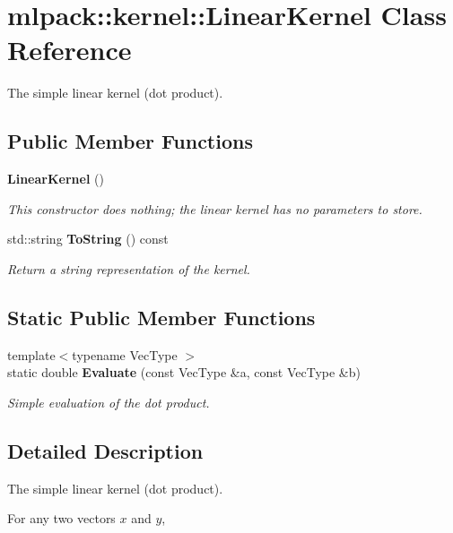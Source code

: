 \section{mlpack\-:\-:kernel\-:\-:Linear\-Kernel Class Reference}
\label{classmlpack_1_1kernel_1_1LinearKernel}


The simple linear kernel (dot product).  


\subsection*{Public Member Functions}
\begin{DoxyCompactItemize}
\item 
{\bf Linear\-Kernel} ()
\begin{DoxyCompactList}\small\item\em This constructor does nothing; the linear kernel has no parameters to store. \end{DoxyCompactList}\item 
std\-::string {\bf To\-String} () const 
\begin{DoxyCompactList}\small\item\em Return a string representation of the kernel. \end{DoxyCompactList}\end{DoxyCompactItemize}
\subsection*{Static Public Member Functions}
\begin{DoxyCompactItemize}
\item 
{\footnotesize template$<$typename Vec\-Type $>$ }\\static double {\bf Evaluate} (const Vec\-Type \&a, const Vec\-Type \&b)
\begin{DoxyCompactList}\small\item\em Simple evaluation of the dot product. \end{DoxyCompactList}\end{DoxyCompactItemize}


\subsection{Detailed Description}
The simple linear kernel (dot product). 

For any two vectors $ x $ and $ y $,


